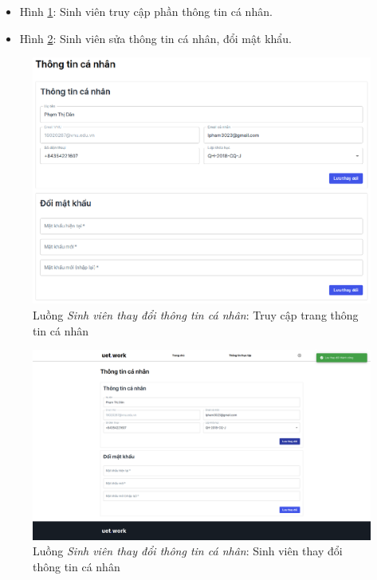 \documentclass[./../main.tex]{subfiles}
\begin{document}
\begin{itemize}
	\item Hình \ref{fig:student_access_info}: Sinh viên truy cập phần thông tin cá nhân.
	\item Hình \ref{fig:student_edit_info}: Sinh viên sửa thông tin cá nhân, đổi mật khẩu.
\end{itemize}

\begin{figure}[]
	\includegraphics[width=\linewidth]{./images/image45.png}
	\caption{Luồng \emph{Sinh viên thay đổi thông tin cá nhân}: Truy cập trang thông tin cá nhân}
	\label{fig:student_access_info}
\end{figure}

\begin{figure}[]
	\includegraphics[width=\linewidth]{./images/image46.png}
	\caption{Luồng \emph{Sinh viên thay đổi thông tin cá nhân}: Sinh viên thay đổi thông tin cá nhân}
	\label{fig:student_edit_info}
\end{figure}
\end{document}
